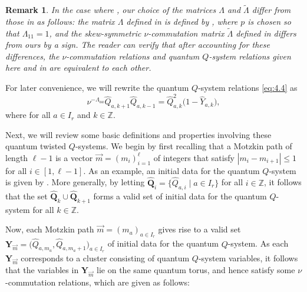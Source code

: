 \documentclass[10pt,a4paper]{amsart}
\numberwithin{equation}{section}
\newtheorem*{remark*}{Remark}
\begin{document}
\begin{remark*}
In the case where , our choice of the matrices $\Lambda$ and $\tilde{\Lambda}$ differ from those in \cite{DFK24} as follows: the matrix $\Lambda$ defined in \cite[Definition 4.1]{DFK24} is defined by , where $p$ is chosen so that $\Lambda_{11}=1$, and the skew-symmetric $\nu$-commutation matrix $\tilde{\Lambda}$ defined in \cite[Remark 4.2]{DFK24} differs from ours by a sign. The reader can verify that after accounting for these differences, the $\nu$-commutation relations and quantum $Q$-system relations given here and in \cite{DFK24} are equivalent to each other.
\end{remark*}

For later convenience, we will rewrite the quantum  $Q$-system relations \eqref{eq:4.4} as
\begin{equation}\label{eq:4.5}
\nu^{-\Lambda_{aa}}\widehat{Q}_{a,k+1}\widehat{Q}_{a,k-1}= \widehat{Q}_{a,k}^2\bigl(1-\widehat{Y}_{a,k}\bigr),
\end{equation}
where  for all $a\in I_r$ and $k\in\mathbb{Z}$.

Next, we will review some basic definitions and properties involving these quantum twisted $Q$-systems. We begin by first recalling that a Motzkin path of length $\ell-1$ is a vector ${\vec{m}=(m_i)_{i=1}^{\ell}}$ of integers that satisfy $|m_i-m_{i+1}|\leq 1$ for all $i\in[1,\ell-1]$. As an example, an initial data for the quantum  $Q$-system is given by . More generally, by letting $\widehat{\mathbf{Q}}_i=\bigl\{\widehat{Q}_{a,i}\mid a\in I_r\bigr\}$ for all $i\in\mathbb{Z}$, it follows that the set $\widehat{\mathbf{Q}}_k\cup\widehat{\mathbf{Q}}_{k+1}$ forms a valid set of initial data for the quantum  $Q$-system for all $k\in\mathbb{Z}$.

Now, each Motzkin path $\vec{m}=(m_a)_{a\in I_r}$ gives rise to a valid set $\mathbf{Y}_{\vec{m}}=\bigl(\widehat{Q}_{a,m_a}, \widehat{Q}_{a,m_a+1}\bigr)_{a\in I_r}$ of initial data for the quantum $Q$-system. As each $\mathbf{Y}_{\vec{m}}$ corresponds to a cluster consisting of quantum $Q$-system variables, it follows that the variables in $\mathbf{Y}_{\vec{m}}$ lie on the same quantum torus, and hence satisfy some $\nu$-commutation relations, which are given as follows:
\end{document}
